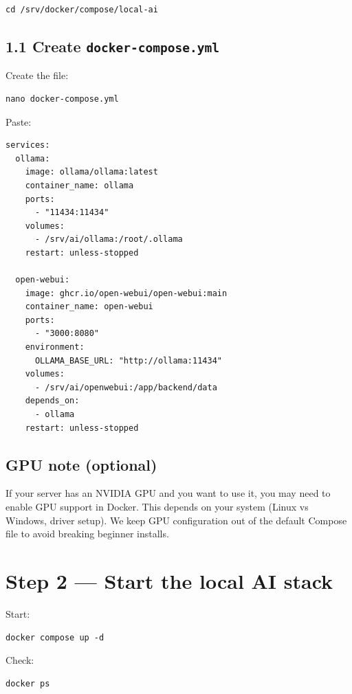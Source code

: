 \begin{lstlisting}
cd /srv/docker/compose/local-ai
\end{lstlisting}

\subsection{1.1 Create \texttt{docker-compose.yml}}
Create the file:

\begin{lstlisting}
nano docker-compose.yml
\end{lstlisting}

Paste:

\begin{lstlisting}
services:
  ollama:
    image: ollama/ollama:latest
    container_name: ollama
    ports:
      - "11434:11434"
    volumes:
      - /srv/ai/ollama:/root/.ollama
    restart: unless-stopped

  open-webui:
    image: ghcr.io/open-webui/open-webui:main
    container_name: open-webui
    ports:
      - "3000:8080"
    environment:
      OLLAMA_BASE_URL: "http://ollama:11434"
    volumes:
      - /srv/ai/openwebui:/app/backend/data
    depends_on:
      - ollama
    restart: unless-stopped
\end{lstlisting}

\subsection{GPU note (optional)}
If your server has an NVIDIA GPU and you want to use it, you may need to enable GPU support in Docker.
This depends on your system (Linux vs Windows, driver setup).
We keep GPU configuration out of the default Compose file to avoid breaking beginner installs.


\section{Step 2 --- Start the local AI stack}
Start:

\begin{lstlisting}
docker compose up -d
\end{lstlisting}

Check:

\begin{lstlisting}
docker ps
\end{lstlisting}

